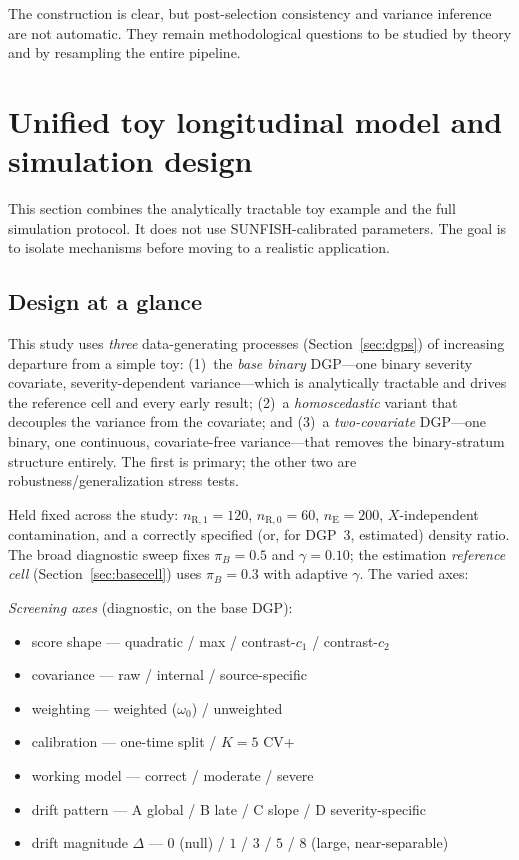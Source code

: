 \documentclass[11pt]{article}
\newcommand{\R}{\mathrm{R}}
\newcommand{\E}{\mathrm{E}}
\begin{document}
The construction is clear, but post-selection consistency and variance inference are not automatic. They remain methodological questions to be studied by theory and by resampling the entire pipeline.

\section{Unified toy longitudinal model and simulation design}

This section combines the analytically tractable toy example and the full simulation protocol. It does not use SUNFISH-calibrated parameters. The goal is to isolate mechanisms before moving to a realistic application.

\subsection{Design at a glance}

This study uses \emph{three} data-generating processes (Section~\ref{sec:dgps}) of increasing departure from a simple toy: (1)~the \emph{base binary} DGP---one binary severity covariate, severity-dependent variance---which is analytically tractable and drives the reference cell and every early result; (2)~a \emph{homoscedastic} variant that decouples the variance from the covariate; and (3)~a \emph{two-covariate} DGP---one binary, one continuous, covariate-free variance---that removes the binary-stratum structure entirely. The first is primary; the other two are robustness/generalization stress tests.

Held fixed across the study: $n_{\R,1}=120$, $n_{\R,0}=60$, $n_{\E}=200$, $X$-independent contamination, and a correctly specified (or, for DGP~3, estimated) density ratio. The broad diagnostic sweep fixes $\pi_B=0.5$ and $\gamma=0.10$; the estimation \emph{reference cell} (Section~\ref{sec:basecell}) uses $\pi_B=0.3$ with adaptive $\gamma$. The varied axes:

\emph{Screening axes} (diagnostic, on the base DGP):
\begin{itemize}
    \item score shape --- quadratic / max / contrast-$c_1$ / contrast-$c_2$
    \item covariance --- raw / internal / source-specific
    \item weighting --- weighted ($\omega_0$) / unweighted
    \item calibration --- one-time split / $K{=}5$ CV+
    \item working model --- correct / moderate / severe
    \item drift pattern --- A global / B late / C slope / D severity-specific
    \item drift magnitude $\Delta$ --- $0$ (null) / $1$ / $3$ / $5$ / $8$ (large, near-separable)
\end{itemize}
\end{document}
